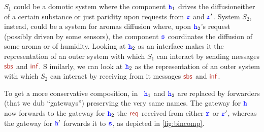 \noindent
$S_1$ could be a domotic system where the component ${\mathtt{\color{blue}{ {h}}}}_1$ drives the diffusioneither of a certain substance or just paridity upon requests from ${\mathtt{\color{blue}{ {r}}}}$ and ${\mathtt{\color{blue}{ {r}}}}'$.
System $S_2$, instead, could be a system for aromas diffusion where, upon ${\mathtt{\color{blue}{ {h}}}}_2$'s request
(possibly driven by some sensors), 
the component ${\mathtt{\color{blue}{ {s}}}}$ coordinates the diffusion of some aroma or of humidity.  
 Looking at ${\mathtt{\color{blue}{ {h}}}}_2$ as an interface makes it the representation of an outer system with which
 $S_1$ can interact by sending messages $\msg[sbs]$ and $\msg[inf]$. S
 imilarly, we can look at ${\mathtt{\color{blue}{ {h}}}}_2$ as the
 representation of an outer system with which
 $S_2$ can interact by receiving from it messages $\msg[sbs]$ and $\msg[inf]$.
 
 To get a more conservative composition, in~\cite{BdLH19} ${\mathtt{\color{blue}{ {h}}}}_1$ and ${\mathtt{\color{blue}{ {h}}}}_2$ are
replaced by forwarders (that we dub ``gateways'') preserving the very same names.
The gateway for ${\mathtt{\color{blue}{ {h}}}}$ now forwards to the gateway for ${\mathtt{\color{blue}{ {h}}}}_2$ the $\msg[req]$ received from either 
${\mathtt{\color{blue}{ {r}}}}$ or ${\mathtt{\color{blue}{ {r}}}}'$, whereas the gateway for ${\mathtt{\color{blue}{ {h}}}}'$ forwards it to ${\mathtt{\color{blue}{ {s}}}}$, as depicted in \cref{fig:bincomp}.  
\begin{figure}[h]
\end{figure}

